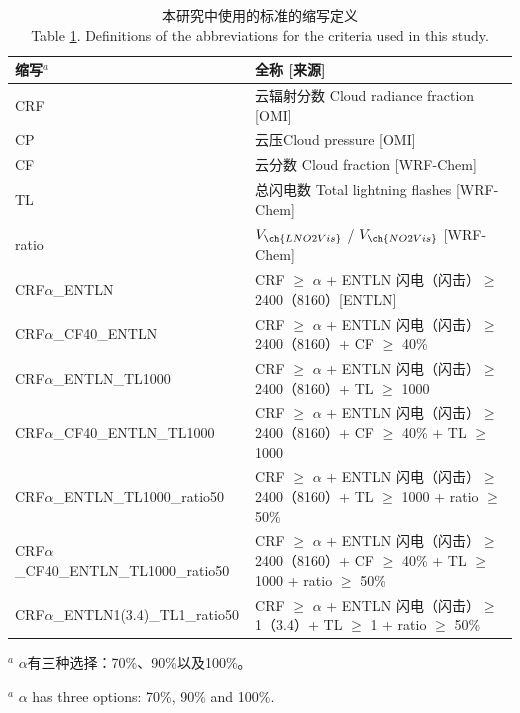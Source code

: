 \begin{table}[H]
\caption{本研究中使用的标准的缩写定义\\Table \ref{table:Abbreviations}. Definitions of the abbreviations for the criteria used in this study.}
\scriptsize
\begin{tabular}{ll}
\hline
缩写$^a$ & 全称 [来源] \\
\hline
CRF                             & 云辐射分数 Cloud radiance fraction [OMI] \\
CP                              & 云压Cloud pressure [OMI] \\
CF                              & 云分数 Cloud fraction [WRF-Chem] \\
TL                              & 总闪电数 Total lightning flashes [WRF-Chem] \\
ratio                           & $V_{\ch{LNO2Vis}}$ / $V_{\ch{NO2Vis}}$ [WRF-Chem] \\
CRF$\alpha$\_ENTLN                   & CRF $\geq$ $\alpha$ + ENTLN 闪电（闪击）$\geq$ 2400（8160）[ENTLN]\\
CRF$\alpha$\_CF40\_ENTLN              & CRF $\geq$ $\alpha$ + ENTLN 闪电（闪击）$\geq$ 2400（8160）+ CF $\geq$ 40\% \\
CRF$\alpha$\_ENTLN\_TL1000            & CRF $\geq$ $\alpha$ + ENTLN 闪电（闪击）$\geq$ 2400（8160）+ TL $\geq$ 1000 \\
CRF$\alpha$\_CF40\_ENTLN\_TL1000      & CRF $\geq$ $\alpha$ + ENTLN 闪电（闪击）$\geq$ 2400（8160）+ CF $\geq$ 40\% + TL $\geq$ 1000 \\
CRF$\alpha$\_ENTLN\_TL1000\_ratio50   & CRF $\geq$ $\alpha$ + ENTLN 闪电（闪击）$\geq$ 2400（8160）+ TL $\geq$ 1000 + ratio $\geq$ 50\% \\
CRF$\alpha$\_CF40\_ENTLN\_TL1000\_ratio50 & CRF $\geq$ $\alpha$ + ENTLN 闪电（闪击）$\geq$ 2400（8160）+ CF $\geq$ 40\% + TL $\geq$ 1000 + ratio $\geq$ 50\% \\
CRF$\alpha$\_ENTLN1(3.4)\_TL1\_ratio50    & CRF $\geq$ $\alpha$ + ENTLN 闪电（闪击）$\geq$ 1（3.4）+ TL $\geq$ 1 + ratio $\geq$ 50\% \\
\hline
\end{tabular}
\begin{tablenotes}
\linespread{1}\footnotesize
\item $^a$ $\alpha$有三种选择：70\%、90\%以及100\%。
\item $^a$ $\alpha$ has three options: 70\%, 90\% and 100\%.
\end{tablenotes}
\label{table:Abbreviations}
\end{table}


